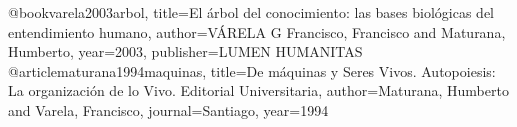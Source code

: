 @book{varela2003arbol,
  title={El {\'a}rbol del conocimiento: las bases biol{\'o}gicas del entendimiento humano},
  author={V{\'A}RELA G Francisco, Francisco and Maturana, Humberto},
  year={2003},
  publisher={LUMEN HUMANITAS}
}
@article{maturana1994maquinas,
  title={De m{\'a}quinas y Seres Vivos. Autopoiesis: La organizaci{\'o}n de lo Vivo. Editorial Universitaria},
  author={Maturana, Humberto and Varela, Francisco},
  journal={Santiago},
  year={1994}
}